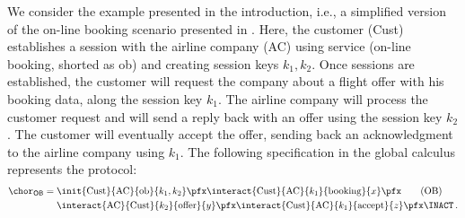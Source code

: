 \begin{example}\label{Logic4Struct:ex:onlinebooking}
  We consider the example presented in the introduction, i.e., a
  simplified version of the on-line booking scenario presented in
  \cite{LOP-places09}. Here, the customer (Cust) establishes a session
  with the airline company (AC) using service (on-line booking,
  shorted as ob) and creating session keys $k_1,k_2$. Once sessions
  are established, the customer will request the company about a
  flight offer with his booking data, along the session key $k_1$. The
  airline company will process the customer request and will send a
  reply back with an offer using the session key $k_2$. The customer
  will eventually accept the offer, sending back an acknowledgment to
  the airline company using $k_1$. The following specification in the
  global calculus represents the protocol:
  \begin{align} \label{Logic4Struct:example:syntax} \chor_{\mathsf{OB}} = {} &
    \init{\text{Cust}}{\text{AC}}{\text{ob}}{k_1,k_2} \pfx
    \interact{\text{Cust}}{\text{AC}}{k_1}{\text{booking}}{x} \pfx \tag{OB} \\
    & \interact{\text{AC}}{\text{Cust}}{k_2}{\text{offer}}{y} \pfx
    \interact{\text{Cust}}{\text{AC}}{k_1}{\text{accept}}{z} \pfx
    \INACT \notag \, .
  \end{align}
\end{example}


